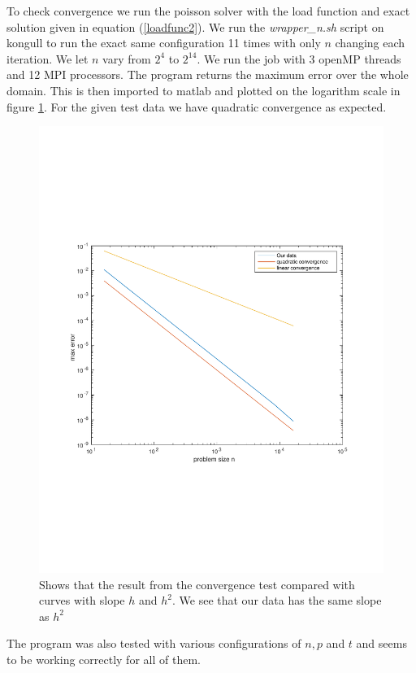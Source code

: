 To check convergence we run the poisson solver with the load function and exact solution given in equation (\ref{loadfunc2}). We run the \textit{wrapper\_n.sh} script on kongull to run the exact same configuration 11 times with only $n$ changing each iteration. We let $n$ vary from $2^4$ to $2^{14}$. We run the job with 3 openMP threads and 12 MPI processors. The program returns the maximum error over the whole domain. This is then imported to matlab and plotted on the logarithm scale in figure \ref{fig:checkConv}. For the given test data we have quadratic convergence as expected.


\begin{figure}[h]
\centering
\includegraphics[width=0.6\linewidth]{./figures/checkConv}
\caption{Shows that the result from the convergence test compared with curves with slope $h$ and $h^2$. We see that our data has the same slope as $h^2$}
\label{fig:checkConv}
\end{figure}

The program was also tested with various configurations of $n, p$ and $t$ and seems to be working correctly for all of them.
